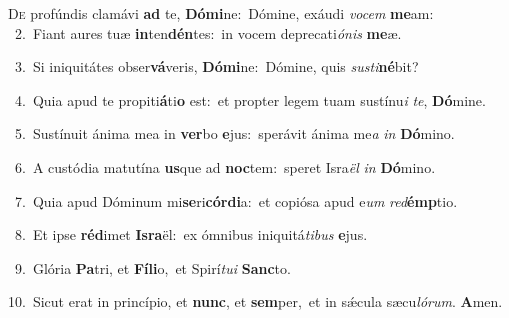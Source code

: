 \lettrine{\initial\textcolor{\initialcolor}{D}}{e} profúndis clamávi \textbf{ad} te, \textbf{Dó}\-\textbf{mi}ne:~\star Dómine, exáudi \textit{vo}\-\textit{cem} \textbf{me}\-am:\\
{\numbfont\textcolor{\numbcolor}{~2.}}~Fiant aures tuæ \textbf{in}\-ten\-\textbf{dén}\-tes:~\star in vocem deprecati\-\textit{ó}\-\textit{nis} \textbf{me}\-æ.\par
{\numbfont\textcolor{\numbcolor}{~3.}}~Si iniquitátes obser\-\textbf{vá}\-veris, \textbf{Dó}\-\textbf{mi}ne:~\star Dómine, quis \textit{sus}\-\textit{ti}\textbf{né}bit?\par
{\numbfont\textcolor{\numbcolor}{~4.}}~Quia apud te propiti\-\textbf{á}\-ti\textbf{o} est:~\star et propter legem tuam sustínu\textit{i} \textit{te}\-, \textbf{Dó}\-mine.\par
{\numbfont\textcolor{\numbcolor}{~5.}}~Sustínuit ánima mea in \textbf{ver}\-bo \textbf{e}\-jus:~\star sperávit ánima me\textit{a} \textit{in} \textbf{Dó}\-mino.\par
{\numbfont\textcolor{\numbcolor}{~6.}}~A custódia matutína \textbf{us}\-que ad \textbf{noc}\-tem:~\star speret Isra\textit{ël} \textit{in} \textbf{Dó}\-mino.\par
{\numbfont\textcolor{\numbcolor}{~7.}}~Quia apud Dóminum mi\-\textbf{se}\-ri\-\textbf{cór}\-\textbf{di}a:~\star et copiósa apud e\textit{um} \textit{red}\-\textbf{émp}tio.\par
{\numbfont\textcolor{\numbcolor}{~8.}}~Et ipse \textbf{réd}\-imet \textbf{Is}\-\textbf{ra}ël:~\star ex ómnibus iniquitá\-\textit{ti}\-\textit{bus} \textbf{e}\-jus.\par
{\numbfont\textcolor{\numbcolor}{~9.}}~Glória \textbf{Pa}\-tri, et \textbf{Fí}\-\textbf{li}o,~\star et Spirí\-\textit{tu}\-\textit{i} \textbf{Sanc}\-to.\par
{\numbfont\textcolor{\numbcolor}{10.}}~Sicut erat in princípio, et \textbf{nunc}\-, et \textbf{sem}\-per,~\star et in sǽcula sæcu\-\textit{ló}\-\textit{rum}. \textbf{A}\-men.\par
